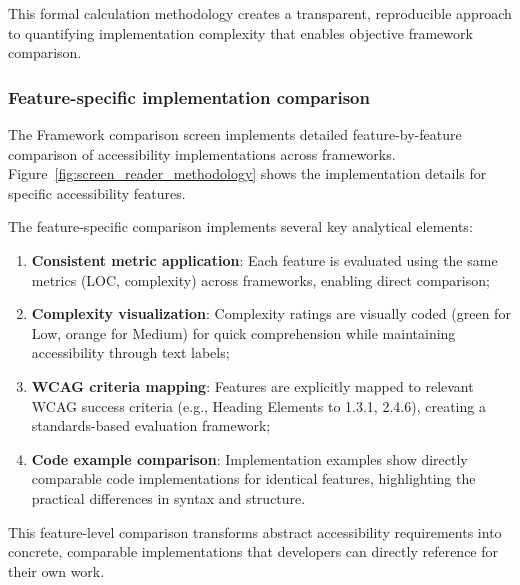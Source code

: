 This formal calculation methodology creates a transparent, reproducible approach to quantifying implementation complexity that enables objective framework comparison.

\subsubsection{Feature-specific implementation comparison}

The Framework comparison screen implements detailed feature-by-feature comparison of accessibility implementations across frameworks. Figure~\ref{fig:screen_reader_methodology} shows the implementation details for specific accessibility features.

The feature-specific comparison implements several key analytical elements:

\begin{enumerate}
    \item \textbf{Consistent metric application}: Each feature is evaluated using the same metrics (LOC, complexity) across frameworks, enabling direct comparison;
    
    \item \textbf{Complexity visualization}: Complexity ratings are visually coded (green for Low, orange for Medium) for quick comprehension while maintaining accessibility through text labels;
    
    \item \textbf{WCAG criteria mapping}: Features are explicitly mapped to relevant WCAG success criteria (e.g., Heading Elements to 1.3.1, 2.4.6), creating a standards-based evaluation framework;
    
    \item \textbf{Code example comparison}: Implementation examples show directly comparable code implementations for identical features, highlighting the practical differences in syntax and structure.
\end{enumerate}

This feature-level comparison transforms abstract accessibility requirements into concrete, comparable implementations that developers can directly reference for their own work.

\newpage

